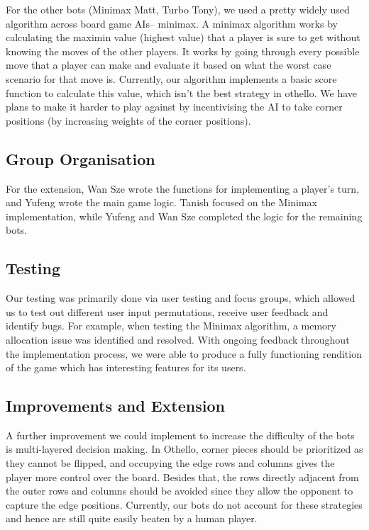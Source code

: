 \documentclass[a4paper,11pt]{article}
\begin{document}
For the other bots (Minimax Matt, Turbo Tony), we used a pretty widely used algorithm across board game AIs-- minimax. A minimax algorithm works by calculating the maximin value (highest value) that a player is sure to get without knowing the moves of the other players. It works by going through every possible move that a player can make and evaluate it based on what the worst case scenario for that move is. Currently, our algorithm implements a basic score function to calculate this value, which isn't the best strategy in othello. We have plans to make it harder to play against by incentivising the AI to take corner positions (by increasing weights of the corner positions).

\subsection{Group Organisation}
For the extension, Wan Sze wrote the functions for implementing a player's turn, and Yufeng wrote the main game logic. Tanish focused on the Minimax implementation, while Yufeng and Wan Sze completed the logic for the remaining bots.

\subsection{Testing}
Our testing was primarily done via user testing and focus groups, which allowed us to test out different user input permutations, receive user feedback and identify bugs. For example, when testing the Minimax algorithm, a memory allocation issue was identified and resolved. With ongoing feedback throughout the implementation process, we were able to produce a fully functioning rendition of the game which has interesting features for its users.

\subsection{Improvements and Extension}
A further improvement we could implement to increase the difficulty of the bots is multi-layered decision making. In Othello, corner pieces should be prioritized as they cannot be flipped, and occupying the edge rows and columns gives the player more control over the board. Besides that, the rows directly adjacent from the outer rows and columns should be avoided since they allow the opponent to capture the edge positions. Currently, our bots do not account for these strategies and hence are still quite easily beaten by a human player.
\end{document}
